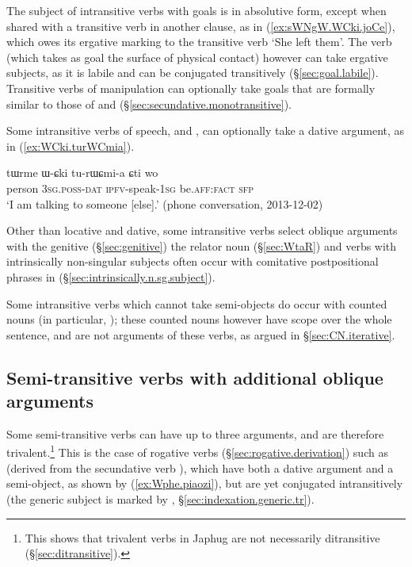 The subject of intransitive verbs with goals is in absolutive form, except when shared with a transitive verb in another clause, as  in (\ref{ex:sWNgW.WCki.joCe}), which owes its ergative marking to the transitive verb  `She left them'. The verb  (which takes as goal the surface of physical contact) however can take ergative subjects, as it is labile and can be conjugated transitively (§\ref{sec:goal.labile}). Transitive verbs of manipulation can optionally take goals that are formally similar to those of  and  (§\ref{sec:secundative.monotransitive}).

Some intransitive verbs of speech,  and , can optionally take a dative argument, as in (\ref{ex:WCki.turWCmia}).

\begin{exe}
\ex   \label{ex:WCki.turWCmia}
 \gll tɯrme ɯ-ɕki tu-rɯɕmi-a ɕti wo \\
 person \textsc{3sg}.\textsc{poss}-\textsc{dat} \textsc{ipfv}-speak-\textsc{1sg} be.\textsc{aff}:\textsc{fact} \textsc{sfp} \\
\glt `I am talking to someone [else].' (phone conversation, 2013-12-02)
\end{exe}

Other than locative and dative, some intransitive verbs select oblique arguments with the genitive (§\ref{sec:genitive}) the relator noun  (§\ref{sec:WtaR}) and verbs with intrinsically non-singular subjects often occur with comitative postpositional phrases in  (§\ref{sec:intrinsically.n.sg.subject}).


Some intransitive verbs which cannot take semi-objects do occur with counted nouns (in particular, ); these counted nouns however have scope over the whole sentence, and are not arguments of these verbs, as argued in §\ref{sec:CN.iterative}.  

\subsection{Semi-transitive verbs with additional oblique arguments} \label{sec:semi.transitive.dative}
     
Some semi-transitive verbs can have up to three arguments, and are therefore trivalent.\footnote{
This shows that trivalent verbs in Japhug are not necessarily ditransitive (§\ref{sec:ditransitive}).
} This is the case of rogative verbs (§\ref{sec:rogative.derivation}) such as  (derived from the secundative verb ), which have both a dative argument and a semi-object, as shown by (\ref{ex:Wphe.piaozi}), but are yet conjugated intransitively (the generic subject is marked by , §\ref{sec:indexation.generic.tr}).


